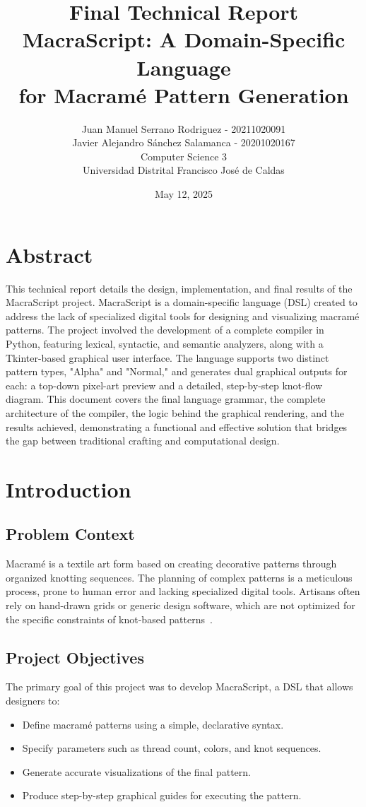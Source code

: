 \documentclass[12pt,a4paper]{report}
\title{{\Huge \textbf{Final Technical Report}}\\
       {\Large MacraScript: A Domain-Specific Language\\for Macramé Pattern Generation}}
\author{Juan Manuel Serrano Rodriguez - 20211020091 \\ Javier Alejandro Sánchez Salamanca - 20201020167 \\
\vspace{0.5cm} \normalsize{Computer Science 3} \\
\normalsize{Universidad Distrital Francisco José de Caldas}}
\date{May 12, 2025}
\begin{document}
\maketitle
\tableofcontents

\chapter*{Abstract}
This technical report details the design, implementation, and final results of the MacraScript project. MacraScript is a domain-specific language (DSL) created to address the lack of specialized digital tools for designing and visualizing macramé patterns. The project involved the development of a complete compiler in Python, featuring lexical, syntactic, and semantic analyzers, along with a Tkinter-based graphical user interface. The language supports two distinct pattern types, "Alpha" and "Normal," and generates dual graphical outputs for each: a top-down pixel-art preview and a detailed, step-by-step knot-flow diagram. This document covers the final language grammar, the complete architecture of the compiler, the logic behind the graphical rendering, and the results achieved, demonstrating a functional and effective solution that bridges the gap between traditional crafting and computational design.

\chapter{Introduction}

\section{Problem Context}
Macramé is a textile art form based on creating decorative patterns through organized knotting sequences. The planning of complex patterns is a meticulous process, prone to human error and lacking specialized digital tools. Artisans often rely on hand-drawn grids or generic design software, which are not optimized for the specific constraints of knot-based patterns~\cite{karner2005}.

\section{Project Objectives}
The primary goal of this project was to develop MacraScript, a DSL that allows designers to:
\begin{itemize}
    \item Define macramé patterns using a simple, declarative syntax.
    \item Specify parameters such as thread count, colors, and knot sequences.
    \item Generate accurate visualizations of the final pattern.
    \item Produce step-by-step graphical guides for executing the pattern.
\end{itemize}
\end{document}
